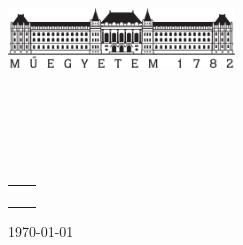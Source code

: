 \hypersetup{pageanchor=false}
\begin{titlepage}
\begin{center}
\includegraphics[width=60mm,keepaspectratio]{figures/bme_logo.pdf}\\
\vspace{0.3cm}
\textbf{\bme}\\
\textmd{\vik}\\
\textmd{\viktanszek}\\[5cm]

\vspace{0.4cm}
{\huge \bfseries \vikcim}\\[0.8cm]
\vspace{0.5cm}
\textsc{\Large \vikdoktipus}\\[4cm]

{
	\renewcommand{\arraystretch}{0.85}
	\begin{tabular}{cc}
	 \makebox[7cm]{\emph{\keszitette}} & \makebox[7cm]{\emph{\konzulens}} \\ \noalign{\smallskip}
	 \makebox[7cm]{\szerzo} & \makebox[7cm]{\vikkonzulensA} \\
	  & \makebox[7cm]{\vikkonzulensB} \\
	  & \makebox[7cm]{\vikkonzulensC} \\
	\end{tabular}
}

\vfill
{\large \today}
\end{center}
\end{titlepage}
\hypersetup{pageanchor=false}

